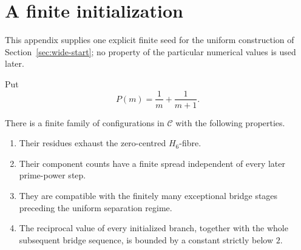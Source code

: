 \section{A finite initialization}
\label{app:prefix-seed}

This appendix supplies one explicit finite seed for the uniform construction of Section~\ref{sec:wide-start}; no property of the particular numerical values is used later.

Put
\[
P(m)=\frac1m+\frac1{m+1}.
\]

\begin{lemma}\label{lem:finite-prefix-initialization}
There is a finite family of configurations in $\mathcal C$ with the following properties.
\begin{enumerate}
\item Their residues exhaust the zero-centred $H_6$-fibre.
\item Their component counts have a finite spread independent of every later prime-power step.
\item They are compatible with the finitely many exceptional bridge stages preceding the uniform separation regime.
\item The reciprocal value of every initialized branch, together with the whole subsequent bridge sequence, is bounded by a constant strictly below $2$.
\end{enumerate}
\end{lemma}

